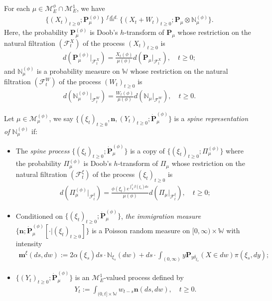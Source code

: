 \begin{cor}
	For each $\mu \in \mathcal M_E^\phi \cap \mathcal M_E^1$, we have
\begin{align}
	\{(X_t)_{t\geq 0}; \mathbf P_\mu^{(\phi)}\}
	\overset{f.d.d.}{=} \{(X_t + W_t)_{t\geq 0}; \mathbf P_\mu \otimes \mathbb N^{(\phi)}_\mu\}.
\end{align}
	Here, the probability $\mathbf P_\mu^{(\phi)}$ is Doob's $h$-transform of $\mathbf P_\mu$ whose restriction on the natural filtration $(\mathscr F_t^X)$ of the process $(X_t)_{t\geq 0}$ is
\begin{align}
	d ( \mathbf P_\mu^{(\phi)}|_{\mathscr F_t^X})
	= \frac{X_t(\phi)}{ \mu(\phi)} d(\mathbf P_\mu|_{\mathscr F_t^X}),
	\quad t\geq 0;
\end{align}
	and $\mathbb N_\mu^{(\phi)}$ is a probability measure on $\mathbb W$ whose restriction on the natural filtration $(\mathscr F_t^W)$ of the process $(W_t)_{t\geq 0}$ is
\begin{align}
	d(\mathbb N_\mu^{(\phi)} |_{\mathscr F^W_t}  )
	= \frac{W_t(\phi)}{\mu(\phi)} d(\mathbb N_\mu |_{\mathscr F^W_t}  ),
	\quad t\geq 0.
\end{align}
\end{cor}

	Let $\mu \in \mathcal M^{(\phi)}_\mu$, we say $\{(\xi_t)_{t\geq 0}, \mathbf n, (Y_t)_{ t\geq 0}; \dot {\mathbf P}^{(\phi)}_\mu\}$ is a \emph{spine representation of $\mathbb N^{(\phi)}_\mu$} if:
\begin{itemize}
\item
	The \emph{spine process} $\{(\xi_t)_{t\geq 0}; \dot{\mathbf P}^{(\phi)}_\mu\}$ is a copy of $\{(\xi_t)_{t\geq 0}; \Pi^{(\phi)}_{\mu}\}$ where the probability $\Pi_{\mu}^{(\phi)}$ is Doob's $h$-transform of $\Pi_\mu$ whose restriction on the natural filtration $(\mathscr F_t^\xi)$ of the process $(\xi_t)_{t\geq 0}$ is
\begin{align}
	d(\Pi_{\mu}^{(\phi)} |_{\mathscr F_t^\xi})
	= \frac{\phi(\xi_t)e^{\int_0^t \beta(\xi_s)ds}}{\mu(\phi)} d(\Pi_{\mu} |_{\mathscr F_t^\xi}),
	\quad t\geq 0;
\end{align}
\item
	Conditioned on $\{(\xi_t)_{t\geq 0}; \dot{\mathbf P}^{(\phi)}_\mu\}$, \emph{the immigration measure} $\{\mathbf n; \dot{\mathbf P}^{(\phi)}_\mu[\cdot |(\xi_t)_{t\geq 0}]\}$ is a Poisson random measure on $[0,\infty ) \times \mathbb W$ with
    intensity
\begin{align}\label{eq:meanMeasImmigr}
	\mathbf m^\xi(ds,dw)
	:= 2 \alpha(\xi_s) ds \cdot \mathbb N_{\xi_s}(dw) + ds \cdot \int_{(0,\infty)} y \mathbf P_{y\delta_{\xi_s}}(X\in dw) \pi(\xi_s,dy);
\end{align}
\item
	$\{(Y_t)_{t\geq 0}; \dot{\mathbf P}^{(\phi)}_\mu\}$ is an $\mathcal M^1_E$-valued process defined by
\begin{align}\label{eq:defSpinImmigr}
	Y_t
	:= \int_{(0,t] \times \mathbb W} w_{t-s} \mathbf n(ds,dw),
	\quad t\geq 0.
\end{align}
\end{itemize}

